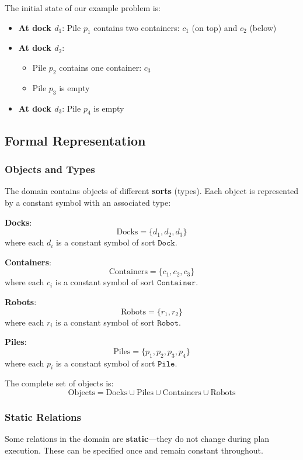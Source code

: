 \documentclass[11pt,a4paper]{article}
\theoremstyle{definition}
\theoremstyle{plain}
\theoremstyle{remark}
\begin{document}
The initial state of our example problem is:

\begin{itemize}
    \item \textbf{At dock $d_1$}: Pile $p_1$ contains two containers: $c_1$ (on top) and $c_2$ (below)
    \item \textbf{At dock $d_2$}: 
    \begin{itemize}
        \item Pile $p_2$ contains one container: $c_3$
        \item Pile $p_3$ is empty
    \end{itemize}
    \item \textbf{At dock $d_3$}: Pile $p_4$ is empty
\end{itemize}

\subsection{Formal Representation}

\subsubsection{Objects and Types}

The domain contains objects of different \textbf{sorts} (types). Each object is represented by a constant symbol with an associated type:

\textbf{Docks}: 
\[
\text{Docks} = \{d_1, d_2, d_3\}
\]
where each $d_i$ is a constant symbol of sort $\texttt{Dock}$.

\textbf{Containers}:
\[
\text{Containers} = \{c_1, c_2, c_3\}
\]
where each $c_i$ is a constant symbol of sort $\texttt{Container}$.

\textbf{Robots}:
\[
\text{Robots} = \{r_1, r_2\}
\]
where each $r_i$ is a constant symbol of sort $\texttt{Robot}$.

\textbf{Piles}:
\[
\text{Piles} = \{p_1, p_2, p_3, p_4\}
\]
where each $p_i$ is a constant symbol of sort $\texttt{Pile}$.

The complete set of objects is:
\[
\text{Objects} = \text{Docks} \cup \text{Piles} \cup \text{Containers} \cup \text{Robots}
\]

\subsubsection{Static Relations}

Some relations in the domain are \textbf{static}—they do not change during plan execution. These can be specified once and remain constant throughout.
\end{document}
